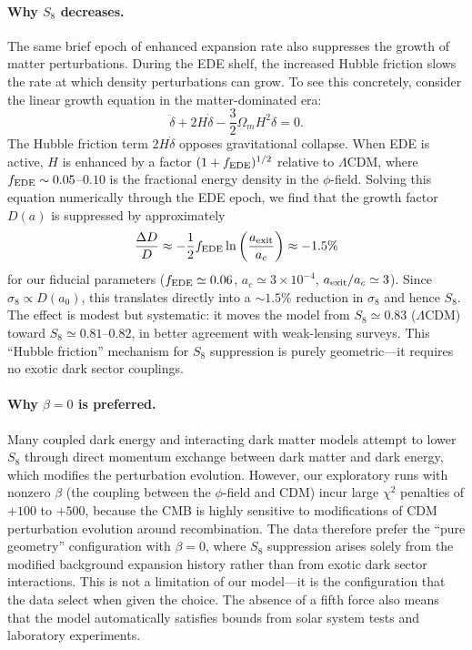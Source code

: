 \documentclass[a4paper,11pt]{article}
\begin{document}
\paragraph{Why $S_8$ decreases.}
The same brief epoch of enhanced expansion rate also suppresses the growth of matter perturbations. During the EDE shelf, the increased Hubble friction slows the rate at which density perturbations can grow. To see this concretely, consider the linear growth equation in the matter-dominated era:
\begin{equation}
\ddot{\delta} + 2H\dot{\delta} - \frac{3}{2}\Omega_m H^2 \delta = 0.
\end{equation}
The Hubble friction term $2H\dot{\delta}$ opposes gravitational collapse. When EDE is active, $H$ is enhanced by a factor $(1 + f_{\rm EDE})^{1/2}$ relative to $\Lambda$CDM, where $f_{\rm EDE} \sim 0.05$--$0.10$ is the fractional energy density in the $\phi$-field. Solving this equation numerically through the EDE epoch, we find that the growth factor $D(a)$ is suppressed by approximately
\begin{equation}
\frac{\Delta D}{D} \approx -\frac{1}{2} f_{\rm EDE} \ln\left(\frac{a_{\rm exit}}{a_c}\right) \approx -1.5\%
\end{equation}
for our fiducial parameters ($f_{\rm EDE} \simeq 0.06$, $a_c \simeq 3 \times 10^{-4}$, $a_{\rm exit}/a_c \simeq 3$). Since $\sigma_8 \propto D(a_0)$, this translates directly into a $\sim 1.5\%$ reduction in $\sigma_8$ and hence $S_8$. The effect is modest but systematic: it moves the model from $S_8 \simeq 0.83$ ($\Lambda$CDM) toward $S_8 \simeq 0.81$--$0.82$, in better agreement with weak-lensing surveys. This ``Hubble friction'' mechanism for $S_8$ suppression is purely geometric---it requires no exotic dark sector couplings.

\paragraph{Why $\beta = 0$ is preferred.}
Many coupled dark energy and interacting dark matter models attempt to lower $S_8$ through direct momentum exchange between dark matter and dark energy, which modifies the perturbation evolution. However, our exploratory runs with nonzero $\beta$ (the coupling between the $\phi$-field and CDM) incur large $\chi^2$ penalties of $+100$ to $+500$, because the CMB is highly sensitive to modifications of CDM perturbation evolution around recombination. The data therefore prefer the ``pure geometry'' configuration with $\beta = 0$, where $S_8$ suppression arises solely from the modified background expansion history rather than from exotic dark sector interactions. This is not a limitation of our model---it is the configuration that the data select when given the choice. The absence of a fifth force also means that the model automatically satisfies bounds from solar system tests and laboratory experiments.
\end{document}
